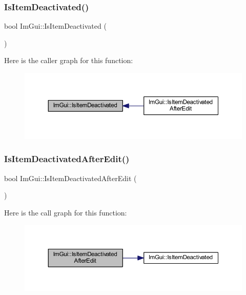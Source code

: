 \subsubsection{\texorpdfstring{Is\+Item\+Deactivated()}{IsItemDeactivated()}}
{\footnotesize\ttfamily bool Im\+Gui\+::\+Is\+Item\+Deactivated (\begin{DoxyParamCaption}{ }\end{DoxyParamCaption})}

Here is the caller graph for this function\+:
\nopagebreak
\begin{figure}[H]
\begin{center}
\leavevmode
\includegraphics[width=350pt]{namespace_im_gui_ada3b1cb76907bb9e630b2482f52f0599_icgraph}
\end{center}
\end{figure}
\mbox{\label{namespace_im_gui_a8bb4c0fc2b9d0e90249310bb4e822485}} 
\subsubsection{\texorpdfstring{Is\+Item\+Deactivated\+After\+Edit()}{IsItemDeactivatedAfterEdit()}}
{\footnotesize\ttfamily bool Im\+Gui\+::\+Is\+Item\+Deactivated\+After\+Edit (\begin{DoxyParamCaption}{ }\end{DoxyParamCaption})}

Here is the call graph for this function\+:
\nopagebreak
\begin{figure}[H]
\begin{center}
\leavevmode
\includegraphics[width=350pt]{namespace_im_gui_a8bb4c0fc2b9d0e90249310bb4e822485_cgraph}
\end{center}
\end{figure}
\mbox{\label{namespace_im_gui_a6508c0e1f28d1e7f9328a944b4f35ff7}} 
